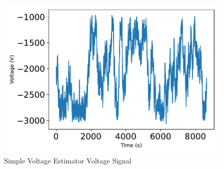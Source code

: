 \begin{figure}[htbp]\centerline{\includegraphics[height=0.4\textwidth, keepaspectratio]{AutoTeX/SimpleVolt}}\caption{Simple Voltage Estimator Voltage Signal}\label{fig:SimpleVolt}\end{figure}